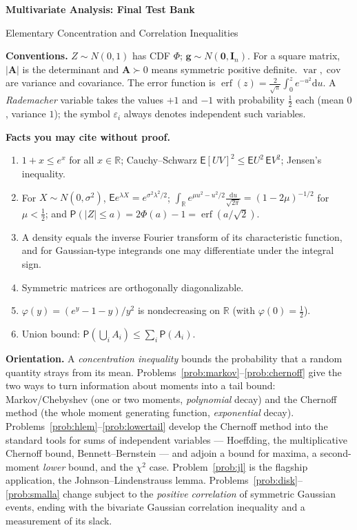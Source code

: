 \documentclass[14pt]{extarticle}
\theoremstyle{definition}
\theoremstyle{remark}
\newcommand\expc{\mathsf{E}}
\newcommand\prb{\mathsf{P}}
\DeclareMathOperator\var{var}
\DeclareMathOperator\cov{cov}
\DeclareMathOperator\erf{erf}
\newcommand{\dd}{\mathrm{d}}
\newcommand{\Real}{\mathbb{R}}
\newcommand{\bA}{\mathbf{A}}
\newcommand{\bI}{\mathbf{I}}
\newcommand{\bg}{\mathbf{g}}
\newcommand{\bzero}{\mathbf{0}}
\begin{document}
\begingroup\centering
{\LARGE\bfseries Multivariate Analysis: Final Test Bank\par}\vspace{2pt}
{\large Elementary Concentration and Correlation Inequalities\par}
\endgroup
\vspace{2mm}

\noindent\textbf{Conventions.}\; $Z\sim N(0,1)$ has CDF $\Phi$; $\bg\sim N(\bzero,\bI_n)$. For a square matrix, $|\bA|$ is the determinant and $\bA\succ0$ means symmetric positive definite. $\var,\cov$ are variance and covariance. The error function is $\erf(z)=\tfrac{2}{\sqrt\pi}\int_0^z e^{-u^2}\dd u$. A \emph{Rademacher} variable takes the values $+1$ and $-1$ with probability $\tfrac12$ each (mean $0$, variance $1$); the symbol $\varepsilon_i$ always denotes independent such variables.

\noindent\textbf{Facts you may cite without proof.}
\begin{enumerate}[label=(F\arabic*),leftmargin=1.3cm,nosep]
\item\label{F:elem} $1+x\le e^x$ for all $x\in\Real$; Cauchy--Schwarz $\expc[UV]^2\le\expc U^2\,\expc V^2$; Jensen's inequality.
\item\label{F:gauss} For $X\sim N(0,\sigma^2)$, $\expc e^{\lambda X}=e^{\sigma^2\lambda^2/2}$; $\int_\Real e^{\mu u^2-u^2/2}\tfrac{\dd u}{\sqrt{2\pi}}=(1-2\mu)^{-1/2}$ for $\mu<\tfrac12$; and $\prb(|Z|\le a)=2\Phi(a)-1=\erf(a/\sqrt2)$.
\item\label{F:fourier} A density equals the inverse Fourier transform of its characteristic function, and for Gaussian-type integrands one may differentiate under the integral sign.
\item\label{F:la} Symmetric matrices are orthogonally diagonalizable.
\item\label{F:phi} $\varphi(y)=(e^y-1-y)/y^2$ is nondecreasing on $\Real$ (with $\varphi(0)=\tfrac12$).
\item\label{F:union} Union bound: $\prb(\bigcup_iA_i)\le\sum_i\prb(A_i)$.
\end{enumerate}

\noindent\textbf{Orientation.}\; A \emph{concentration inequality} bounds the probability that a random quantity strays from its mean. Problems~\ref{prob:markov}--\ref{prob:chernoff} give the two ways to turn information about moments into a tail bound: Markov/Chebyshev (one or two moments, \emph{polynomial} decay) and the Chernoff method (the whole moment generating function, \emph{exponential} decay). Problems~\ref{prob:hlem}--\ref{prob:lowertail} develop the Chernoff method into the standard tools for sums of independent variables --- Hoeffding, the multiplicative Chernoff bound, Bennett--Bernstein --- and adjoin a bound for maxima, a second-moment \emph{lower} bound, and the $\chi^2$ case. Problem~\ref{prob:jl} is the flagship application, the Johnson--Lindenstrauss lemma. Problems~\ref{prob:disk}--\ref{prob:smalla} change subject to the \emph{positive correlation} of symmetric Gaussian events, ending with the bivariate Gaussian correlation inequality and a measurement of its slack.
\end{document}
